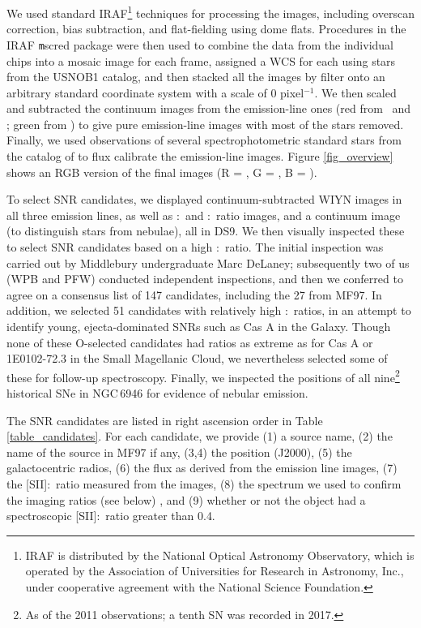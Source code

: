 We used standard IRAF\footnote{IRAF is distributed by the National Optical Astronomy Observatory, which is operated by the Association of Universities for Research in Astronomy, Inc., under cooperative agreement with the National Science Foundation.} techniques for processing the images, including overscan correction, bias subtraction, and flat-fielding using dome flats.  Procedures in the IRAF {\texttt mscred} package were then used to combine the data from the individual chips into a mosaic image for each frame, assigned a WCS for each using stars from the USNOB1 catalog, and then stacked  all the images by   filter onto an arbitrary standard coordinate system with a scale of 0 pixel$^{-1}$.  We then scaled and subtracted the continuum images from the emission-line ones (red from \ha\ and \sii; green from \oiii) to give pure emission-line images with most of the stars removed.  Finally, we used observations of several spectrophotometric standard stars from the catalog of \citet{massey88} to flux calibrate the emission-line images.  Figure \ref{fig_overview} shows an RGB version of the final images (R = \ha, G = \sii, B = \oiii).

To select SNR candidates, we displayed continuum-subtracted WIYN images in all three emission lines, as well as \sii:\ha\  and \oiii:\ha\ ratio images, and a continuum image (to distinguish stars from nebulae), all in DS9.   We then visually inspected these to select SNR candidates based on a high  \sii:\ha\ ratio.  The initial inspection was carried out by Middlebury undergraduate Marc DeLaney; subsequently two of us (WPB and PFW) conducted independent inspections, and then we conferred to agree on a consensus list of 147 candidates, including the 27 from MF97.   In addition, we selected 51 candidates with relatively high \oiii:\ha\ ratios, in an attempt to identify young, ejecta-dominated SNRs such as Cas A in the Galaxy.   Though none of these O-selected candidates had ratios as extreme as for Cas A or  1E0102-72.3 in the Small Magellanic Cloud, we nevertheless selected some of these for follow-up spectroscopy.  Finally, we inspected the positions of all nine\footnote{As of the 2011 observations; a tenth SN was recorded in 2017.} historical SNe in NGC\,6946 for evidence of nebular emission. 


The SNR candidates are listed in right ascension order in Table \ref{table_candidates}.  For each candidate, we provide (1) a source name, (2) the name of the source in MF97 if any,  (3,4) the position  (J2000), (5) the galactocentric radios, (6) the \ha flux as derived from the emission line images, (7) the [SII]:\ha\ ratio measured from the images, (8) the spectrum we used to confirm the imaging ratios (see below) , and (9) whether or not the object had a spectroscopic [SII]:\ha\ ratio greater than 0.4.

